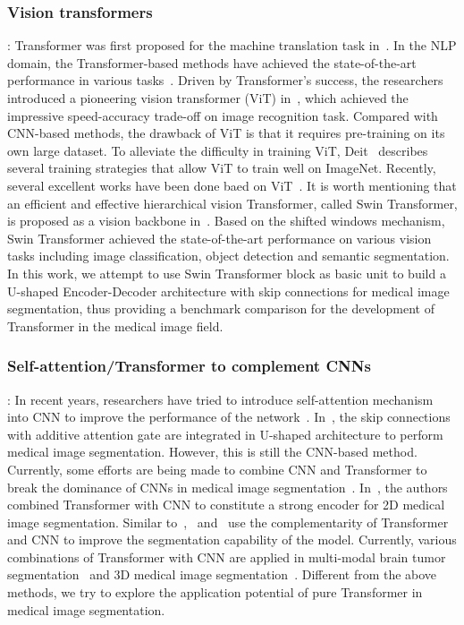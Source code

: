 \documentclass[runningheads]{llncs}
\begin{document}
\subsubsection{Vision transformers}:
Transformer was first proposed for the machine translation task in~\cite{transformer}. In the NLP domain, the Transformer-based methods have achieved the state-of-the-art performance in various tasks~\cite{bert}. Driven by Transformer's success, the researchers introduced a pioneering vision transformer (ViT) in~\cite{vit}, which achieved the impressive speed-accuracy trade-off on image recognition task.
Compared with CNN-based methods, the drawback of ViT is that it requires pre-training on its own large dataset. To alleviate the difficulty in training ViT, Deit~\cite{deit} describes several training strategies that allow ViT to train well on ImageNet. Recently, several excellent works have been done baed on ViT~\cite{pvt,tit,swin}. It is worth mentioning that an efficient and effective hierarchical vision Transformer, called Swin Transformer, is proposed as a vision backbone in~\cite{swin}. Based on the shifted windows mechanism, Swin Transformer achieved the state-of-the-art performance on various vision tasks including image classification, object detection and semantic segmentation. In this work, we attempt to use Swin Transformer block as basic unit to build a U-shaped Encoder-Decoder architecture with skip connections for medical image segmentation, thus providing a benchmark comparison for the development of Transformer in the medical image field.

\subsubsection{Self-attention/Transformer to complement CNNs}:
In recent years, researchers have tried to introduce self-attention mechanism into CNN to improve the performance of the network~\cite{nonlocal}. In~\cite{att-gate}, the skip connections with additive attention gate are integrated in U-shaped architecture to perform medical image segmentation. However, this is still the CNN-based method. Currently, some efforts are being made to combine CNN and Transformer to break the dominance of CNNs in medical image segmentation~\cite{trans-unet,medical-transformer,unetr}. In~\cite{trans-unet}, the authors combined Transformer with CNN to constitute a strong encoder for 2D medical image segmentation. Similar to~\cite{trans-unet},~\cite{medical-transformer} and~\cite{transfuse}  use the complementarity of Transformer and CNN to improve the segmentation capability of the model. Currently, various combinations of Transformer with CNN are applied in multi-modal brain tumor segmentation~\cite{transbts} and 3D medical image segmentation~\cite{unetr,cotr}. Different from the above methods, we try to explore the application potential of pure Transformer in medical image segmentation.
\end{document}
